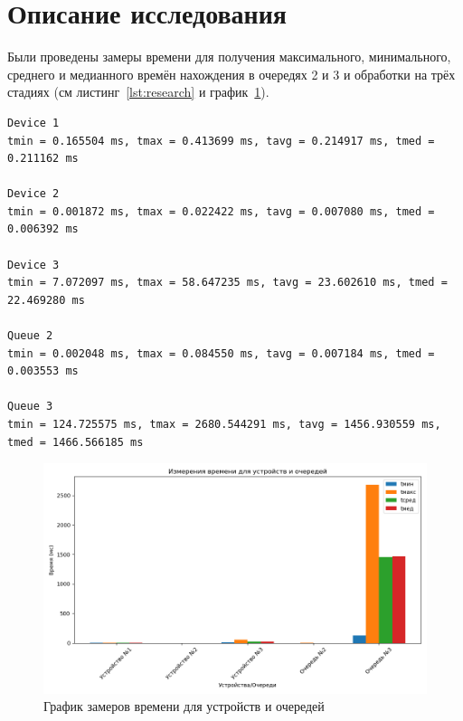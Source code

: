\section{Описание исследования}

\hspace{1.25cm}
Были проведены замеры времени для получения максимального, минимального, среднего и медианного времён нахождения в очередях 2 и 3 и обработки на трёх стадиях (см листинг~\ref{lst:research} и график~\ref{fig:img_graph}).

\vspace{0.25cm}
\begin{lstlisting}[caption=Результаты замеров времени на разном количестве потоков, label=lst:research]
Device 1
tmin = 0.165504 ms, tmax = 0.413699 ms, tavg = 0.214917 ms, tmed = 0.211162 ms

Device 2
tmin = 0.001872 ms, tmax = 0.022422 ms, tavg = 0.007080 ms, tmed = 0.006392 ms

Device 3
tmin = 7.072097 ms, tmax = 58.647235 ms, tavg = 23.602610 ms, tmed = 22.469280 ms

Queue 2
tmin = 0.002048 ms, tmax = 0.084550 ms, tavg = 0.007184 ms, tmed = 0.003553 ms

Queue 3
tmin = 124.725575 ms, tmax = 2680.544291 ms, tavg = 1456.930559 ms, tmed = 1466.566185 ms
\end{lstlisting}

\vspace{-0.25cm}
\begin{figure}[H]
    \centering
    \includegraphics[width=\linewidth]{img/graph.png}
    \caption{График замеров времени для устройств и очередей}
    \label{fig:img_graph}
\end{figure}

